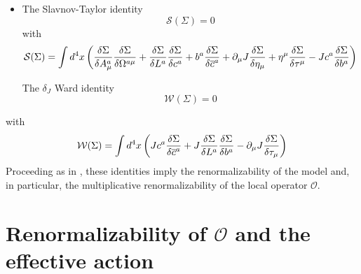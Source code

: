 \documentclass[a4paper,12pt]{article}
\newcommand{\sect}[1]{ \section{#1} \setcounter{equation}{0} }
\begin{document}
\begin{itemize}
\item  The Slavnov-Taylor identity
\begin{equation}
\mathcal{S}(\Sigma )=0  \label{st}
\end{equation}
with
\begin{equation}
\mathcal{S}(\Sigma )=\int d^{4}x\left( \frac{\delta \Sigma }{\delta A_{\mu
}^{a}}\frac{\delta \Sigma }{\delta \Omega ^{a\mu }}+\frac{\delta \Sigma }{%
\delta L^{a}}\frac{\delta \Sigma }{\delta c^{a}}+b^{a}\frac{\delta \Sigma }{%
\delta \overline{c}^{a}}+\partial _{\mu }J\frac{\delta \Sigma }{\delta \eta
_{\mu }}+\eta ^{\mu }\frac{\delta \Sigma }{\delta \tau ^{\mu }}-Jc^{a}\frac{%
\delta \Sigma }{\delta b^{a}}\right)   \label{sto}
\end{equation}

The $\delta _{J}$ Ward identity
\begin{equation}
\mathcal{W}(\Sigma )=0  \label{di}
\end{equation}
\end{itemize}

with
\begin{equation}
\mathcal{W}(\Sigma )=\int d^{4}x\left( Jc^{a}\frac{\delta \Sigma }{\delta
\overline{c}^{a}}+J\frac{\delta \Sigma }{\delta L^{a}}\frac{\delta \Sigma }{%
\delta b^{a}}-\partial _{\mu }J\frac{\delta \Sigma }{\delta \tau _{\mu }}%
\right)  \label{dio}
\end{equation}
Proceeding as in \cite{Dudal:2002pq}, these identities imply the
renormalizability of the model and, in particular, the multiplicative
renormalizability of the local operator $\mathcal{O}$.

\sect{Renormalizability of $\mathcal{O}$ and the effective action}

\label{sec3}
\end{document}
